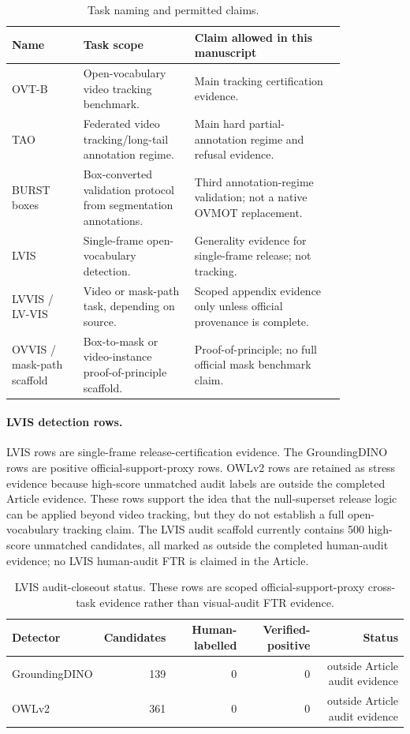 \documentclass[11pt]{article}
\begin{document}
\begin{table}[h]
\centering
\caption{Task naming and permitted claims.}
\small
\begin{tabular}{p{0.18\linewidth}p{0.28\linewidth}p{0.38\linewidth}}
\toprule
Name & Task scope & Claim allowed in this manuscript \\
\midrule
OVT-B & Open-vocabulary video tracking benchmark. & Main tracking certification evidence. \\
TAO & Federated video tracking/long-tail annotation regime. & Main hard partial-annotation regime and refusal evidence. \\
BURST boxes & Box-converted validation protocol from segmentation annotations. & Third annotation-regime validation; not a native OVMOT replacement. \\
LVIS & Single-frame open-vocabulary detection. & Generality evidence for single-frame release; not tracking. \\
LVVIS / LV-VIS & Video or mask-path task, depending on source. & Scoped appendix evidence only unless official provenance is complete. \\
OVVIS / mask-path scaffold & Box-to-mask or video-instance proof-of-principle scaffold. & Proof-of-principle; no full official mask benchmark claim. \\
\bottomrule
\end{tabular}
\end{table}

\paragraph{LVIS detection rows.}
LVIS rows are single-frame release-certification evidence.
The GroundingDINO rows are positive official-support-proxy rows.
OWLv2 rows are retained as stress evidence because high-score unmatched audit labels are outside the completed Article evidence.
These rows support the idea that the null-superset release logic can be applied beyond video tracking, but they do not establish a full open-vocabulary tracking claim.
The LVIS audit scaffold currently contains 500 high-score unmatched candidates, all marked as outside the completed human-audit evidence; no LVIS human-audit FTR is claimed in the Article.

\begin{table}[h]
\centering
\caption{LVIS audit-closeout status. These rows are scoped official-support-proxy cross-task evidence rather than visual-audit FTR evidence.}
\small
\begin{tabular}{lrrrr}
\toprule
Detector & Candidates & Human-labelled & Verified-positive & Status \\
\midrule
GroundingDINO & 139 & 0 & 0 & outside Article audit evidence \\
OWLv2 & 361 & 0 & 0 & outside Article audit evidence \\
\bottomrule
\end{tabular}
\end{table}
\end{document}
